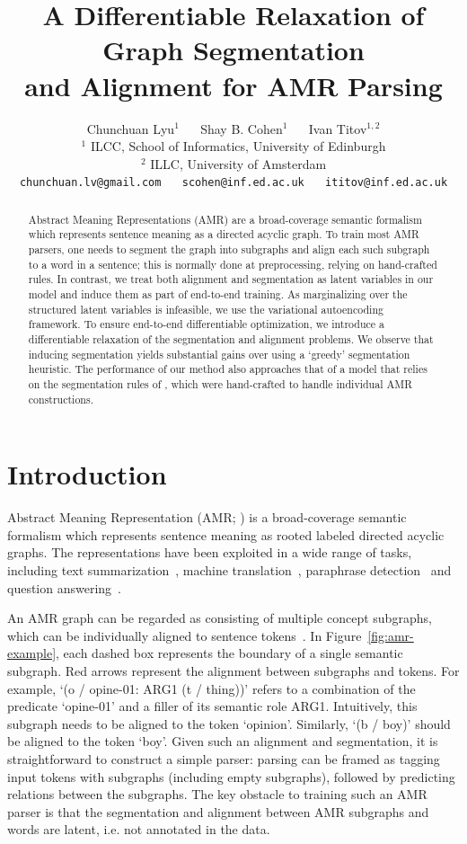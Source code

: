 \documentclass[11pt]{article}
\title{A Differentiable Relaxation of Graph Segmentation \\  and Alignment  for AMR Parsing}
\author{ {Chunchuan Lyu}$^1$  ~~ {Shay B. Cohen}$^1$ ~~ {Ivan Titov}$^{1,2}$ 
 \smallskip \\
      $^1$ {ILCC, School of Informatics, University of Edinburgh}  \\
    $^2$ {ILLC, University of Amsterdam}
 \smallskip \\
 {\tt chunchuan.lv@gmail.com} ~~ {\tt scohen@inf.ed.ac.uk} ~~ {\tt ititov@inf.ed.ac.uk}  \\
}
\date{}
\begin{document}
\setlength{\abovedisplayskip}{1pt}
\setlength{\belowdisplayskip}{1pt}
\setlength{\abovedisplayshortskip}{1pt}
\setlength{\belowdisplayshortskip}{1pt}
\maketitle
\begin{abstract}
Abstract Meaning Representations (AMR) are a broad-coverage semantic formalism which represents sentence meaning as a directed acyclic graph. To train most AMR parsers, one needs to segment the graph into subgraphs and align each such subgraph to a word in a sentence; this is normally done at preprocessing, relying on hand-crafted rules. In contrast, we treat both alignment and segmentation as latent variables in our model and induce them as part of end-to-end training.
 As marginalizing over the structured latent variables is infeasible, we use the variational autoencoding framework. 
 To ensure end-to-end differentiable optimization, we introduce a differentiable relaxation of the segmentation and alignment problems.
We observe that inducing segmentation yields substantial gains over using a `greedy' segmentation heuristic. The performance of our method also approaches that of a model that relies on the segmentation rules of \citet{lyu-titov-2018-amr}, which were hand-crafted to handle individual AMR constructions.
\end{abstract}


\section{Introduction}

Abstract Meaning Representation (AMR; \citealt{Banarescu13abstractmeaning}) is a broad-coverage semantic formalism which represents sentence meaning as rooted labeled directed acyclic graphs. 
The representations have been exploited in a wide range of tasks, including text summarization~\cite{Liu2015TowardAS,dohare2017text,Hardy2018GuidedNL}, machine translation~\cite{Jones2012SemanticsBasedMT,Song2019SemanticNM}, paraphrase detection~\cite{Issa2018AbstractMR} and question answering~\cite{Mitra2016AddressingAQ}. 

An AMR graph can be regarded as consisting of 
multiple concept subgraphs, which can be individually
aligned to sentence tokens~\cite{Flanigan2014ADG}.  
 In Figure~\ref{fig:amr-example}, each dashed box represents the boundary of a single semantic subgraph. Red arrows represent the alignment between subgraphs and tokens.
 For example, `(o / opine-01: ARG1 (t / thing))' refers to a combination of the predicate `opine-01' and a filler of its semantic role ARG1.  Intuitively, this subgraph needs to be aligned to the token `opinion'. Similarly, `(b / boy)' should be aligned to the token `boy'. Given such an alignment and segmentation, it is straightforward to construct a simple  parser: parsing can be framed as tagging input tokens with subgraphs (including empty subgraphs), followed by predicting relations between the subgraphs. The key obstacle to training such an AMR parser is that the segmentation
 and alignment between AMR subgraphs and words are latent, i.e. not annotated in the data.
 
\end{document}
